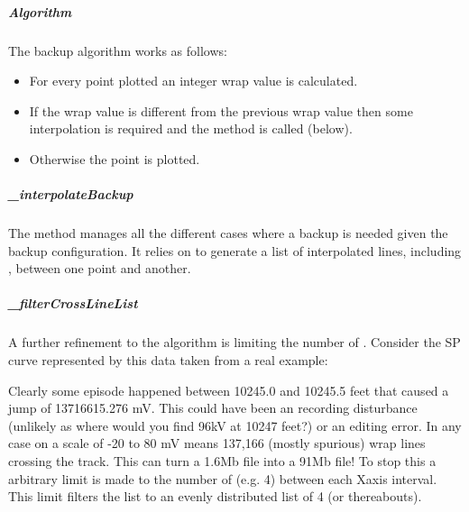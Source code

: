 \documentclass[letterpaper,10pt,english]{sphinxmanual}
\begin{document}
\subparagraph{Algorithm}
\label{\detokenize{tech/plotting:algorithm}}
The backup algorithm works as follows:
\begin{itemize}
\item {} 
For every point plotted an integer wrap value is calculated.

\item {} 
If the wrap value is different from the previous wrap value then some interpolation is required and the  method is called (below).

\item {} 
Otherwise the point is plotted.

\end{itemize}


\subparagraph{\_interpolateBackup}
\label{\detokenize{tech/plotting:interpolatebackup}}
The  method manages all the different cases where a backup is needed given the backup configuration. It relies on  to generate a list of interpolated lines, including ,  between one point and another.


\subparagraph{\_filterCrossLineList}
\label{\detokenize{tech/plotting:filtercrosslinelist}}
A further refinement to the algorithm is limiting the number of . Consider the SP curve represented by this data taken from a real example:

\begin{sphinxVerbatim}[commandchars=\\\{\}]
   
    
    
    
    
    
    
\end{sphinxVerbatim}

Clearly some episode happened between 10245.0 and 10245.5 feet that caused a jump of 13716615.276 mV. This could have been an recording disturbance (unlikely as where would you find 96kV at 10247 feet?) or an editing error. In any case on a scale of -20 to 80 mV means 137,166 (mostly spurious) wrap lines crossing the track. This can turn a 1.6Mb file into a 91Mb file! To stop this a arbitrary limit is made to the number of  (e.g. 4) between each Xaxis interval. This limit filters the  list to an evenly distributed list of 4 (or thereabouts).
\end{document}
